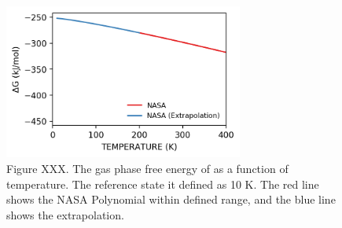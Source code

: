 \documentclass[12pt]{article}
\begin{document}
\begin{figure}[H]
    \centering
    \includegraphics[width=0.70\textwidth]{zi-images/00-General-Graphics/2021-figure-H2O-pMuTT.png}
    \caption{Figure XXX. The gas phase free energy of  as a function of temperature. The reference state it defined as 10 K. The red line shows the NASA Polynomial within defined range, and the blue line shows the extrapolation.}    \label{fig:h2o-pmutt-expression}
\end{figure}


%
%
\end{document}
